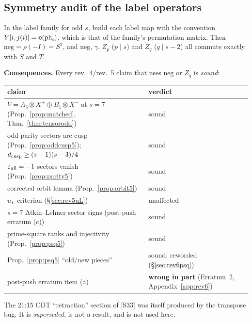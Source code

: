\subsection{Symmetry audit of the label operators}\label{sec:rev6audit}
\begin{proposition}\label{prop:audit6}
In the label family for odd $s$, build each label map with the convention $Y[i,j(i)]=\mathbf{e}(\mathrm{ph}_i)$, which is that of the family's permutation matrix. Then $\mathrm{neg}=\rho(-I)=S^2$, and $\mathrm{neg}$, $\gamma$, $Z_p$ ($p\mid s$) and $Z_q$ ($q\mid s-2$) all commute exactly with $S$ and $T$.
\end{proposition}
\noindent\textbf{Consequences.} Every rev.~4/rev.~5 claim that uses $\mathrm{neg}$ or $Z_q$ is \emph{sound}:
\begin{center}\small
\begin{tabular}{p{7.2cm}l}\toprule
claim & verdict\\\midrule
$V=A_3\otimes X^+\oplus B_1\otimes X^-$ at $s=7$ (Prop.~\ref{prop:matched}, Thm.~\ref{thm:tensorodd}) & sound\\
odd-parity sectors are cusp (Prop.~\ref{prop:oddcusp5}); $d_{\rm cusp}\ge(s-1)(s-3)/4$ & sound\\
$\varepsilon_{\rm all}=-1$ sectors vanish (Prop.~\ref{prop:parity5}) & sound\\
corrected orbit lemma (Prop.~\ref{prop:orbit5}) & sound\\
$u_L$ criterion (\S\ref{sec:rev5uL}) & unaffected\\
$s=7$ Atkin--Lehner sector signs (post-push erratum (c)) & sound\\
prime-square ranks and injectivity (Prop.~\ref{prop:psq5}) & sound\\
Prop.~\ref{prop:psq5} ``old/new pieces'' & sound; reworded (\S\ref{sec:rev6psq})\\
post-push erratum item (a) & \textbf{wrong in part} (Erratum~2, Appendix~\ref{app:rev6})\\\bottomrule
\end{tabular}\end{center}
The 21:15 CDT ``retraction'' section of [S33] was itself produced by the transpose bug. It is \emph{superseded}, is not a result, and is not used here.

